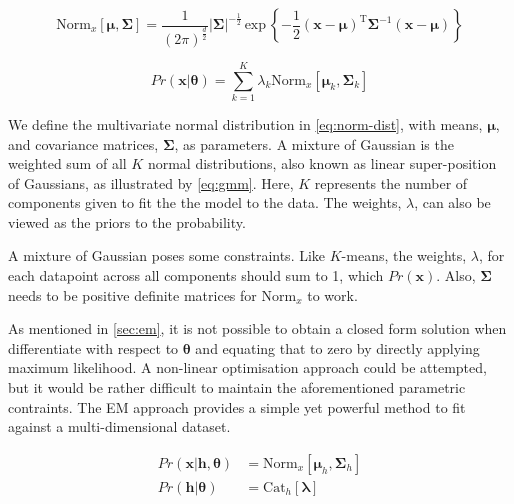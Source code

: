 \documentclass[11pt,openright,a4paper]{article}
\numberwithin{equation}{section}
\begin{document}

\begin{equation}
    \label{eq:norm-dist}
    \mathrm{Norm}_{x}\left[\boldsymbol{\mu},\boldsymbol{\Sigma}\right] = 
        \frac{1}{\left( 2 \pi \right)^\frac{d}{2}}
        |\boldsymbol\Sigma|^{-\frac{1}{2}} 
        \,\mathrm{exp}\, 
        \left\{-
            \frac{1}{2}
            \left(\boldsymbol{x}-\boldsymbol{\mu}\right)^\mathrm{T} 
            \boldsymbol{\Sigma}^{-1}
            \left(\boldsymbol{x}-\boldsymbol{\mu}\right)
        \right\}
\end{equation}

\begin{equation} \label{eq:gmm}
    Pr\left(\boldsymbol{x} | \boldsymbol{\theta}\right) =
    \sum_{k=1}^K \lambda_k \mathrm{Norm}_{x}\left[\boldsymbol{\mu}_k, \boldsymbol{\Sigma}_k\right]
\end{equation}

We define the multivariate normal distribution in \autoref{eq:norm-dist}, with means, $\boldsymbol\mu$, and covariance matrices, $\boldsymbol\Sigma$, as parameters. A mixture of Gaussian is the weighted sum of all $K$ normal distributions, also known as linear super-position of Gaussians, as illustrated by \autoref{eq:gmm}. Here, $K$ represents the number of components given to fit the the model to the data. The weights, $\lambda$, can also be viewed as the priors to the probability.


A mixture of Gaussian poses some constraints. Like $K$-means, the weights, $\lambda$, for each datapoint across all components should sum to 1, which $Pr\left(\boldsymbol{x}\right)$. Also, $\boldsymbol{\Sigma}$ needs to be positive definite matrices for $\mathrm{Norm}_x$ to work.

As mentioned in \autoref{sec:em}, it is not possible to obtain a closed form solution when differentiate with respect to $\boldsymbol{\theta}$ and equating that to zero by directly applying maximum likelihood. A non-linear optimisation approach could be attempted, but it would be rather difficult to maintain the aforementioned parametric contraints. The EM approach provides a simple yet powerful method to fit against a multi-dimensional dataset. 

\begin{equation} \label{eq:gmm-back}
    \begin{aligned}
        Pr\left(\boldsymbol{x}|\boldsymbol{h},\boldsymbol{\theta}\right) 
            &= \mathrm{Norm}_x\left[\boldsymbol{\mu}_h,\boldsymbol{\Sigma}_h\right] \\ 
        Pr(\boldsymbol{h}|\boldsymbol{\theta}) &= \mathrm{Cat}_h\left[ \boldsymbol{\lambda}\right]
    \end{aligned}
\end{equation}
\end{document}
